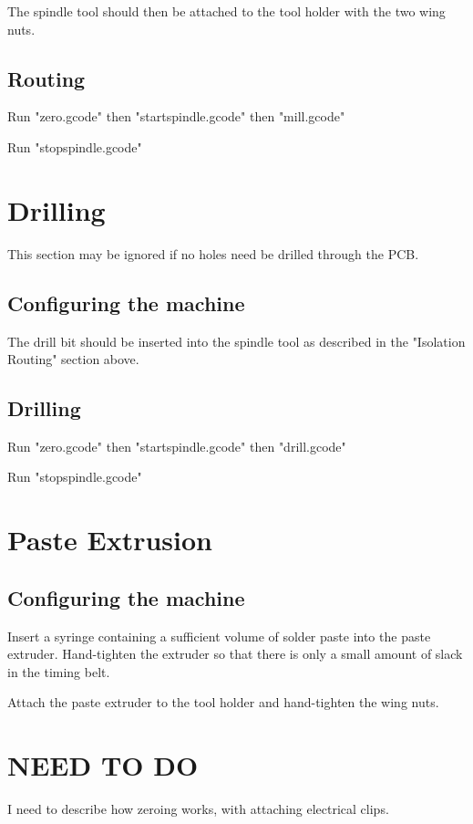 \documentclass[a4paper,11pt]{article}  %
\begin{document}
The spindle tool should then be attached to the tool holder with the two
wing nuts.

\subsection{Routing}
Run "zero.gcode" then "startspindle.gcode" then "mill.gcode"

Run "stopspindle.gcode"

\section{Drilling}
This section may be ignored if no holes need be drilled through the PCB.

\subsection{Configuring the machine}
The drill bit should be inserted into the spindle tool as described in 
the "Isolation Routing" section above.

\subsection{Drilling}
Run "zero.gcode" then "startspindle.gcode" then "drill.gcode"

Run "stopspindle.gcode"

\section{Paste Extrusion}

\subsection{Configuring the machine}
Insert a syringe containing a sufficient volume of solder paste into
the paste extruder. Hand-tighten the extruder so that there is only a 
small amount of slack in the timing belt.

Attach the paste extruder to the tool holder and hand-tighten the wing 
nuts.




\newpage
\appendix
\appendixpage
\addappheadtotoc






\section{NEED TO DO}
I need to describe how zeroing works, with attaching electrical clips.
\end{document}
